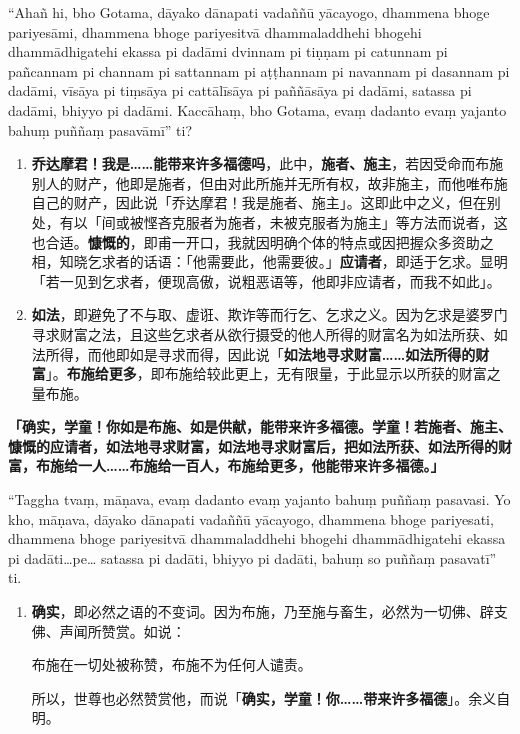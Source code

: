 “Ahañ hi, bho Gotama, dāyako dānapati vadaññū yācayogo, dhammena bhoge pariyesāmi, dhammena bhoge pariyesitvā dhammaladdhehi bhogehi dhammādhigatehi ekassa pi dadāmi dvinnam pi tiṇṇam pi catunnam pi pañcannam pi channam pi sattannam pi aṭṭhannam pi navannam pi dasannam pi dadāmi, vīsāya pi tiṃsāya pi cattālīsāya pi paññāsāya pi dadāmi, satassa pi dadāmi, bhiyyo pi dadāmi. Kaccāhaṃ, bho Gotama, evaṃ dadanto evaṃ yajanto bahuṃ puññaṃ pasavāmī” ti?

\begin{enumerate}\item \textbf{乔达摩君！我是……能带来许多福德吗}，此中，\textbf{施者、施主}，若因受命而布施别人的财产，他即是施者，但由对此所施并无所有权，故非施主，而他唯布施自己的财产，因此说「乔达摩君！我是施者、施主」。这即此中之义，但在别处，有以「间或被悭吝克服者为施者，未被克服者为施主」等方法而说者，这也合适。\textbf{慷慨的}，即甫一开口，我就因明确个体的特点或因把握众多资助之相，知晓乞求者的话语：「他需要此，他需要彼。」\textbf{应请者}，即适于乞求。显明「若一见到乞求者，便现高傲，说粗恶语等，他即非应请者，而我不如此」。
\item \textbf{如法}，即避免了不与取、虚诳、欺诈等而行乞、乞求之义。因为乞求是婆罗门寻求财富之法，且这些乞求者从欲行摄受的他人所得的财富名为如法所获、如法所得，而他即如是寻求而得，因此说「\textbf{如法地寻求财富……如法所得的财富}」。\textbf{布施给更多}，即布施给较此更上，无有限量，于此显示以所获的财富之量布施。\end{enumerate}

\textbf{「确实，学童！你如是布施、如是供献，能带来许多福德。学童！若施者、施主、慷慨的应请者，如法地寻求财富，如法地寻求财富后，把如法所获、如法所得的财富，布施给一人……布施给一百人，布施给更多，他能带来许多福德。」}

“Taggha tvaṃ, māṇava, evaṃ dadanto evaṃ yajanto bahuṃ puññaṃ pasavasi. Yo kho, māṇava, dāyako dānapati vadaññū yācayogo, dhammena bhoge pariyesati, dhammena bhoge pariyesitvā dhammaladdhehi bhogehi dhammādhigatehi ekassa pi dadāti…pe… satassa pi dadāti, bhiyyo pi dadāti, bahuṃ so puññaṃ pasavatī” ti.

\begin{enumerate}\item \textbf{确实}，即必然之语的不变词。因为布施，乃至施与畜生，必然为一切佛、辟支佛、声闻所赞赏。如说：\begin{quoting}布施在一切处被称赞，布施不为任何人谴责。\end{quoting}所以，世尊也必然赞赏他，而说「\textbf{确实，学童！你……带来许多福德}」。余义自明。\end{enumerate}

